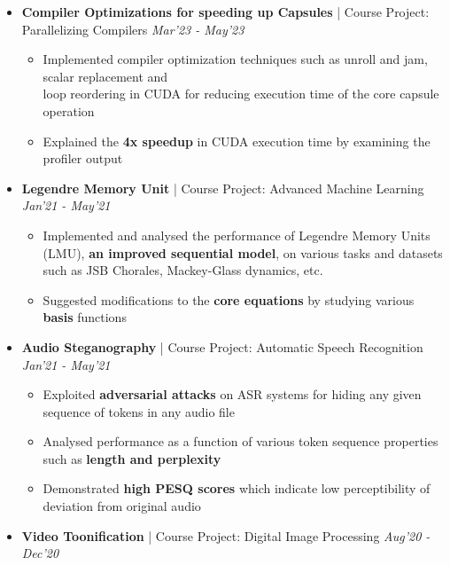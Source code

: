 \documentclass[10pt,letterpaper,sans]{moderncv}
\providecommand{\sl}{\slshape}
\begin{document}
\begin{itemize}
\item \textbf{Compiler Optimizations for speeding up Capsules} | Course Project: Parallelizing Compilers \hfill{\sl  Mar'23 - May'23}\\
\vspace{-12pt}
\begin{itemize}
\item Implemented compiler optimization techniques such as unroll and jam, scalar replacement and\\ loop reordering in CUDA for reducing execution time of the core capsule operation
\item Explained the \textbf{4x speedup} in CUDA execution time by examining the profiler output
\end{itemize}
\vspace{5pt}
\item \textbf{Legendre Memory Unit} | Course Project: Advanced Machine Learning \hfill{\sl Jan'21 - May'21}\\
\vspace{-10pt}
\begin{itemize}
\item Implemented and analysed the performance of Legendre Memory Units (LMU), \textbf{an improved sequential model}, on various tasks and datasets such as JSB Chorales, Mackey-Glass dynamics, etc.
\item Suggested modifications to the \textbf{core equations} by studying various \textbf{basis} functions
\end{itemize}
\vspace{5pt}
\item \textbf{Audio Steganography} | Course Project: Automatic Speech Recognition \hfill{\sl Jan'21 - May'21}\\
\vspace{-10pt}
\begin{itemize}
\item Exploited \textbf{adversarial attacks} on ASR systems for hiding any given sequence of tokens in any audio file
\item Analysed performance as a function of various token sequence properties such as \textbf{length and perplexity}
\item Demonstrated \textbf{high PESQ scores} which indicate low perceptibility of deviation from original audio
\end{itemize}
\vspace{5pt}
\item \textbf{Video Toonification} | Course Project: Digital Image Processing \hfill{\sl Aug'20 - Dec'20}\\

\end{itemize}
\end{document}
